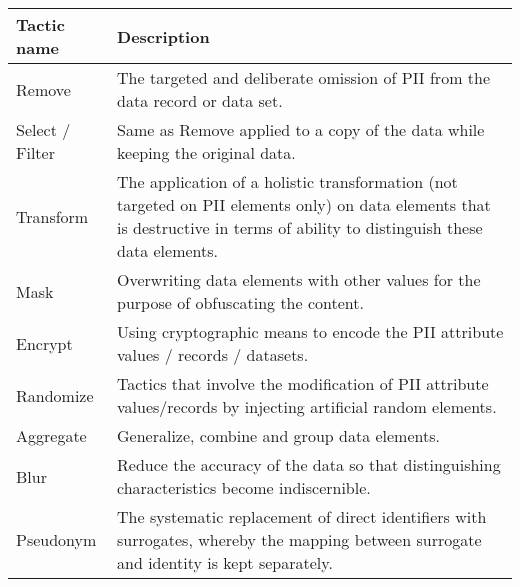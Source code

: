\begin{table}[H]
\begin{center}
\begin{tabulary}{\textwidth}{p{0.17\textwidth}p{0.83\textwidth}}
\textbf{Tactic name} & \textbf{Description}                                                                                                                                                          \\ \hline
Remove               & The targeted and deliberate omission of PII from the data record or data set.                                                                                                 \\
Select / Filter      & Same as Remove applied to a copy of the data while keeping the original data.                                                                                                 \\
Transform            & The application of a holistic transformation (not targeted on PII elements only) on data elements that is destructive in terms of ability to distinguish these data elements. \\
Mask                 & Overwriting data elements with other values for the purpose of obfuscating the content.                                                                                       \\
Encrypt              & Using cryptographic means to encode the PII attribute values / records / datasets.                                                                                            \\
Randomize            & Tactics that involve the modification of PII attribute values/records by injecting artificial random elements.                                                                \\
Aggregate            & Generalize, combine and group data elements.                                                                                                                                  \\
Blur                 & Reduce the accuracy of the data so that distinguishing characteristics become indiscernible.                                                                                  \\
Pseudonym            & The systematic replacement of direct identifiers with surrogates, whereby the mapping between surrogate and identity is kept separately.                                      \\

\end{tabulary}
\end{center}
\end{table}
